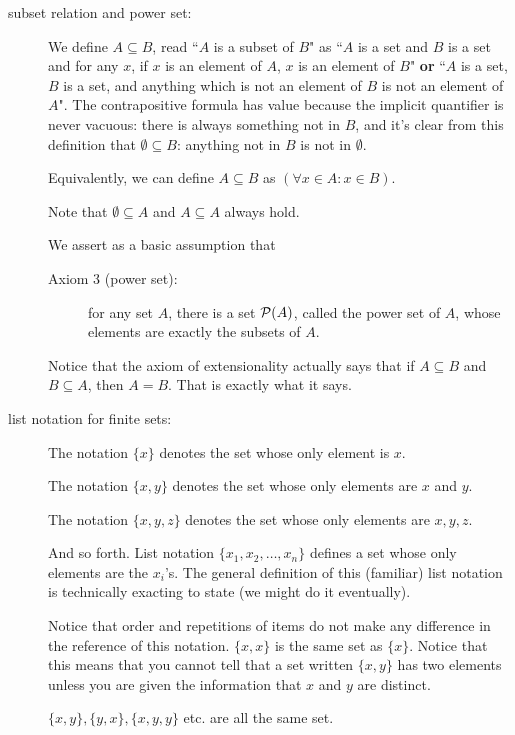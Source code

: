 \documentclass[12pt]{article}
\begin{document}
\begin{description}
\item[subset relation and power set:]  We define $A \subseteq B$, read ``$A$ is a subset of $B$" as  ``$A$ is a set and $B$ is a set and for any $x$, if $x$ is an element of $A$, $x$ is an element of $B$" {\bf or}  ``$A$ is a set, $B$ is a set, and anything which is not an element of $B$ is not an element of $A$".  The contrapositive formula has value because the implicit quantifier is never vacuous:  there is always something not in $B$, and it's clear from this definition that $\emptyset \subseteq B$:  anything not in $B$ is not in $\emptyset$.

Equivalently, we can define $A \subseteq B$ as $(\forall x \in A: x\in B)$.

Note that $\emptyset \subseteq A$ and $A \subseteq A$ always hold.

We assert as a basic assumption that 

\begin{description}

\item[Axiom 3 (power set):]  for any set $A$, there is a set ${\cal P}(A)$, called the power set of $A$, whose elements are exactly the subsets of $A$.

\end{description}

Notice that the axiom of extensionality actually says that if $A \subseteq B$ and $B \subseteq A$, then $A = B$.   That is exactly what it says.


\item[list notation for finite sets:]  The notation $\{x\}$ denotes the set whose only element is $x$.

The notation $\{x,y\}$ denotes the set whose only elements are $x$ and $y$.

The notation $\{x,y,z\}$ denotes the set whose only elements are $x,y,z$.

And so forth.  List notation $\{x_1,x_2,\ldots,x_n\}$ defines a set whose only elements are the $x_i$'s.
The general definition of this (familiar) list notation is technically exacting to state (we might do it eventually).

Notice that order and repetitions of items do not make any difference in the reference of this notation.
$\{x,x\}$ is the same set as $\{x\}$.  Notice that this means that you cannot tell that a set written $\{x,y\}$ has two elements unless you are given the information that $x$ and $y$ are distinct.

$\{x,y\}, \{y,x\}, \{x,y,y\}$ etc. are all the same set.


\end{description}
\end{document}

